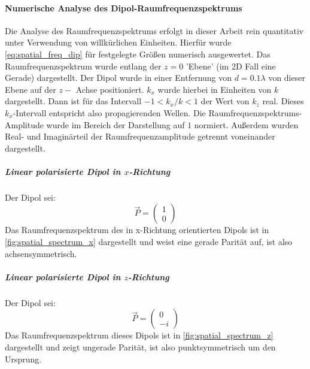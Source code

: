 \documentclass[titlepage]{article}
\begin{document}
	\paragraph{Numerische Analyse des Dipol-Raumfrequenzspektrums}
	Die Analyse des Raumfrequenzspektrums erfolgt in dieser Arbeit rein quantitativ unter Verwendung von willkürlichen Einheiten. Hierfür wurde \eqref{eq:spatial_freq_dip} für festgelegte Größen numerisch ausgewertet.
	Das Raumfrequenzspektrum wurde entlang der $z = 0$ 'Ebene' (im 2D Fall eine Gerade) dargestellt. Der Dipol wurde in einer Entfernung von $d = 0.1 \lambda$  von dieser Ebene auf der $z-$ Achse positioniert. $k_x$ wurde hierbei in Einheiten von $k$ dargestellt. Dann ist für das Intervall $-1 < k_x / k <1$ der Wert von $k_z$ real. Dieses $k_x$-Intervall entspricht also propagierenden Wellen. Die Raumfrequenzspektrums-Amplitude wurde im Bereich der Darstellung auf $1$ normiert. Außerdem wurden Real- und Imaginärteil der Raumfrequenzamplitude getrennt voneinander dargestellt.
	\subparagraph{Linear polarisierte Dipol in $x$-Richtung}
	Der Dipol sei:
	$$\vec{P} = \begin{pmatrix} 1 \\ 0\end{pmatrix}$$
	Das Raumfrequenzspektrum des in x-Richtung orientierten Dipols ist in \ref{fig:spatial_spectrum_x} dargestellt und weist eine gerade Parität auf, ist also achsensymmetrisch.	
	\subparagraph{Linear polarisierte Dipol in $z$-Richtung}
	Der Dipol sei:
	$$\vec{P} = \begin{pmatrix} 0 \\ -i\end{pmatrix}$$
	Das Raumfrequenzspektrum dieses Dipols ist in \ref{fig:spatial_spectrum_z} dargestellt und zeigt ungerade Parität, ist also punktsymmetrisch um den Ursprung.
\end{document}
